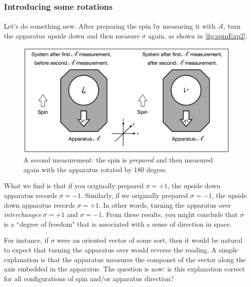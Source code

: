 \documentclass[a4paper,10pt]{article}
\begin{document}
\subsubsection{Introducing some rotations}

\paragraph{} Let's do something new. After preparing the spin by measuring it with $\mathcal{A}$, turn the apparatus upside down and then measure $\sigma$ again, as shown in \autoref{fig:spinExp2}.

\begin{figure}[!htb]
\begin{center}
\includegraphics[width=4.55in]{images/spinExp2.png}
\caption{A second measurement: the spin is \textit{prepared} and then measured again with the apparatus rotated by 180 degree.}
\label{fig:spinExp2}
\end{center}
\end{figure}

What we find is that if you originally prepared $\sigma = +1$, the upside down apparatus records $\sigma = -1$. Similarly, if we originally prepared $\sigma = -1$, the upside down apparatus records $\sigma = +1$. In other words, turning the apparatus over \textit{interchanges} $\sigma = +1$ and $\sigma = -1$. From these results, you might conclude that $\sigma$ is a ``degree of freedom" that is associated with a sense of direction in space. 

For instance, if $\sigma$ were an oriented vector of some sort, then it would be natural to expect that turning the apparatus over would reverse the reading. A simple explanation is that the apparatus measures the componet of the vector along the axis embedded in the apparatus. The question is now: is this explanation correct for all configurations of spin and/or apparatus direction?
\end{document}
